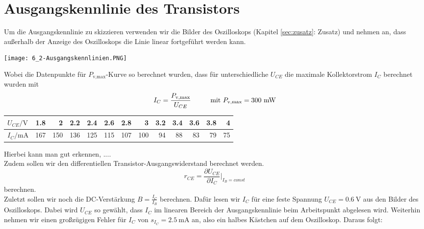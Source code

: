 

\section{Ausgangskennlinie des Transistors}
Um die Ausgangskennlinie zu skizzieren verwenden wir die Bilder des Oszilloskops (Kapitel \ref{sec:zusatz}: Zusatz) und nehmen an, dass außerhalb der Anzeige des Oszilloskops die Linie linear fortgeführt werden kann. 
\begin{center}
    \texttt{[image: 6\_2-Ausgangskennlinien.PNG]}
\end{center}
Wobei die Datenpunkte für $P_{\text{v,max}}$-Kurve so berechnet wurden, dass für unterschiedliche $U_{CE}$ die maximale Kollektorstrom $I_C$ berechnet wurden mit
\begin{align}
    I_C=\frac{P_{\text{v,max}}}{U_{CE}} \hspace*{1cm}\text{mit}~P_{\text{v,max}}=300~\text{mW}
\end{align}
\begin{center}
    \begin{tabular}{l|rrrrrrrrrrrr}
        $U_{CE}/\text{V}$ & 1.8   & 2     & 2.2   & 2.4   & 2.6   & 2.8   & 3     & 3.2   & 3.4   & 3.6   & 3.8   & 4 \\
        \hline
        $I_C/\text{mA}$  & 167 & 150 & 136 & 125 & 115 & 107 & 100 & 94 & 88 & 83 & 79 & 75 \\
    \end{tabular}
\end{center}
Hierbei kann man gut erkennen, ....\\
Zudem sollen wir den differentiellen Transistor-Ausgangswiderstand berechnet werden.
\begin{equation}
r_{CE}=\frac{\partial{U_{CE}}}{\partial{I_C}}\Bigg|_{I_B=const}
\end{equation}
berechnen. \\
Zuletzt sollen wir noch die DC-Verst\"arkung $B=\frac{I_C}{I_B}$ berechnen. Dafür lesen wir $I_C$ für eine feste Spannung $U_{CE}=0.6~\text{V}$ aus den Bilder des Oszilloskops. Dabei wird $U_{CE}$ so gewählt, dass $I_C$ im linearen Bereich der Ausgangskennlinie beim Arbeitspunkt abgelesen wird. Weiterhin nehmen wir einen großzügigen Fehler für $I_C$ von $s_{I_C}=2.5~\text{mA}$ an, also ein halbes Kästchen auf dem Oszilloskop.  Daraus folgt:
